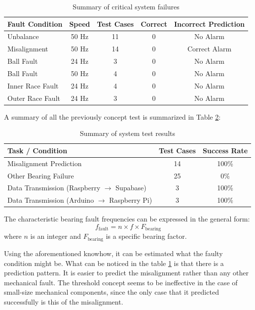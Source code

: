 {		
	\begin{table}[ht]
		\centering
		\caption{Summary of critical system failures}
		\label{tab:critical_failures}
		\begin{tabular}{lcccc}
			\hline
			Fault Condition & Speed & Test Cases & Correct & Incorrect Prediction \\
			\hline
			Unbalance & 50 Hz & 11 & 0 & No Alarm \\
			Misalignment & 50 Hz & 14 & 0 & Correct Alarm \\
			Ball Fault & 24 Hz & 3 & 0 & No Alarm \\
			Ball Fault & 50 Hz & 4 & 0 & No Alarm \\
			Inner Race Fault & 24 Hz & 4 & 0 & No Alarm \\
			Outer Race Fault & 24 Hz & 3 & 0 & No Alarm \\
			\hline
		\end{tabular}
	\end{table}
	
	A summary of all the previously concept test is summarized in Table \ref{tab:system_summary}:
	
	\begin{table}[ht]
		\centering
		\caption{Summary of system test results}
		\label{tab:system_summary}
		\begin{tabular}{lcc}
			\hline
			Task / Condition & Test Cases & Success Rate \\
			\hline
			Misalignment Prediction & 14 & 100\% \\
			Other Bearing Failure   & 25 & 0\% \\
			Data Transmission (Raspberry $\rightarrow$ Supabase) & 3 & 100\% \\
			Data Transmission (Arduino $\rightarrow$ Raspberry Pi) & 3 & 100\% \\
			\hline
		\end{tabular}
	\end{table}
	
	The characteristic bearing fault frequencies can be expressed in the general form:
	\begin{equation}
		f_{\text{fault}} = n \times f \times F_{\text{bearing}}
		\label{eq:general_fault}
	\end{equation}
	where $n$ is an integer and $F_{\text{bearing}}$ is a specific bearing factor.
	
	Using the aforementioned knowhow, it can be estimated what the faulty condition might be. What can be noticed in the table \ref{tab:critical_failures} is that there is a prediction pattern. It is easier to predict the misalignment rather than any other mechanical fault. The threshold concept seems to be ineffective in the case of small-size mechanical components, since the only case that it predicted successfully is this of the misalignment.
	

	
}



